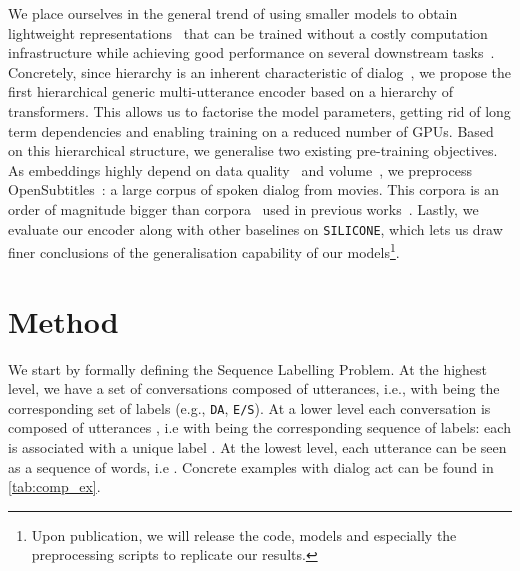 \documentclass[11pt,a4paper]{article}
\begin{document}
We place ourselves in the general trend of using smaller models to obtain lightweight representations~\cite{tiny,albert} that can be trained without a costly computation infrastructure while achieving good performance on several downstream tasks~\cite{efficient}.
Concretely, since hierarchy is an inherent characteristic of dialog~\cite{context}, we propose the first hierarchical generic multi-utterance encoder based on a hierarchy of transformers. This allows us to factorise the model parameters, getting rid of long term dependencies and enabling training on a reduced number of GPUs.
Based on this hierarchical structure, we generalise two existing pre-training objectives. As embeddings highly depend on data quality~\cite{flaubert} and volume~\cite{roberta}, we preprocess OpenSubtitles~\cite{open}: a large corpus of spoken dialog from movies. This corpora is an order of magnitude bigger than corpora~\cite{budzianowski2018multiwoz,ubuntu,cornell} used in previous works~\cite{mehri2019pretraining,emotion_transfert}. Lastly, we evaluate our encoder along with other baselines on \texttt{SILICONE}, which lets us draw finer conclusions of the generalisation capability of our models\footnote{Upon publication, we will release the code, models and especially the preprocessing scripts to replicate our results.}.
%
 
\section{Method}\label{sec:model}
We start by formally defining the Sequence Labelling Problem. At the highest level, we have a set  of conversations composed of utterances, i.e.,  with  being the corresponding set of labels (e.g., \texttt{DA}, \texttt{E/S}). At a lower level each conversation  is composed of utterances , i.e  with  being the corresponding sequence of labels: each  is associated with a unique label . At the lowest level, each utterance  can be seen as a sequence of words, i.e . Concrete examples with dialog act can be found in \autoref{tab:comp_ex}.
\end{document}
